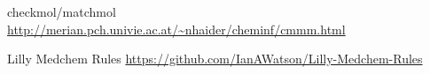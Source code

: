 checkmol/matchmol \url{http://merian.pch.univie.ac.at/~nhaider/cheminf/cmmm.html}

Lilly Medchem Rules \url{https://github.com/IanAWatson/Lilly-Medchem-Rules}
\cite{Bruns_2012}